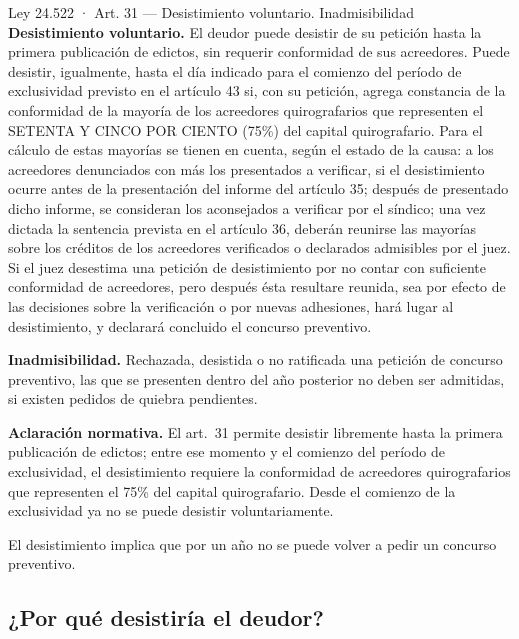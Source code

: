 \documentclass[12pt,oneside]{book}
\begin{document}
\begin{norma}{Ley 24.522 · Art. 31 — Desistimiento voluntario. Inadmisibilidad}
\textbf{Desistimiento voluntario.} El deudor puede desistir de su petición hasta la primera publicación de edictos, sin requerir conformidad de sus acreedores. Puede desistir, igualmente, hasta el día indicado para el comienzo del período de exclusividad previsto en el artículo 43 si, con su petición, agrega constancia de la conformidad de la mayoría de los acreedores quirografarios que representen el SETENTA Y CINCO POR CIENTO (75\%) del capital quirografario. Para el cálculo de estas mayorías se tienen en cuenta, según el estado de la causa: a los acreedores denunciados con más los presentados a verificar, si el desistimiento ocurre antes de la presentación del informe del artículo 35; después de presentado dicho informe, se consideran los aconsejados a verificar por el síndico; una vez dictada la sentencia prevista en el artículo 36, deberán reunirse las mayorías sobre los créditos de los acreedores verificados o declarados admisibles por el juez. Si el juez desestima una petición de desistimiento por no contar con suficiente conformidad de acreedores, pero después ésta resultare reunida, sea por efecto de las decisiones sobre la verificación o por nuevas adhesiones, hará lugar al desistimiento, y declarará concluido el concurso preventivo.

\textbf{Inadmisibilidad.} Rechazada, desistida o no ratificada una petición de concurso preventivo, las que se presenten dentro del año posterior no deben ser admitidas, si existen pedidos de quiebra pendientes.
\end{norma}

\begin{note}
\textbf{Aclaración normativa.} El art.~31 permite desistir libremente hasta la primera publicación de edictos; entre ese momento y el comienzo del período de exclusividad, el desistimiento requiere la conformidad de acreedores quirografarios que representen el 75\% del capital quirografario. Desde el comienzo de la exclusividad ya no se puede desistir voluntariamente.
\end{note}

El desistimiento implica que por un año no se puede volver a pedir un concurso preventivo.

\subsection{¿Por qué desistiría el deudor?}
\end{document}
